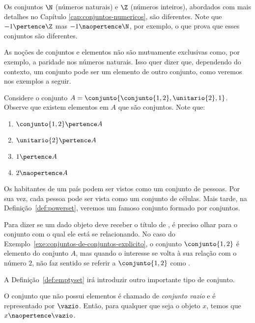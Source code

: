 \begin{example}
    Os conjuntos $\N$ (números naturais) e $\Z$ (números inteiros), abordados com mais detalhes no Capítulo \ref{cap:conjuntos-numericos}, são diferentes. Note que $-1 \pertence \Z$ mas $-1 \naopertence \N$, por exemplo, o que prova que esses conjuntos são diferentes.
\end{example}

As noções de conjuntos e elementos não são mutuamente exclusivas como, por exemplo, a paridade nos números naturais. Isso quer dizer que, dependendo do contexto, um conjunto pode ser um elemento de outro conjunto, como veremos nos exemplos a seguir.

\begin{example}
    \label{exe:conjuntos-de-conjuntos-explicito}
    Considere o conjunto $A = \conjunto{\conjunto{1, 2},\unitario{2}, 1}$. Observe que existem elementos em $A$ que são conjuntos. Note que:
    \begin{enumerate}
        \item $\conjunto{1, 2} \pertence A$
        \item $\unitario{2} \pertence A$
        \item $1 \pertence A$
        \item $2 \naopertence A$
    \end{enumerate}
\end{example}

\begin{example}
    \label{exe:conjuntos-de-conjuntos-implicito}
    Os habitantes de um país podem ser vistos como um conjunto de pessoas. Por sua vez, cada pessoa pode ser vista como um conjunto de células. Mais tarde, na Definição~\ref{def:powerset}, veremos um famoso conjunto formado por conjuntos.
\end{example}

Para dizer se um dado objeto deve receber o título de , é preciso olhar para o conjunto com o qual ele está se relacionando. No caso do Exemplo~\ref{exe:conjuntos-de-conjuntos-explicito}, o conjunto $\conjunto{1, 2}$ é elemento do conjunto $A$, mas quando o interesse se volta à sua relação com o número $2$, não faz sentido se referir a $\conjunto{1, 2}$ como .

A Definição~\ref{def:emptyset} irá introduzir outro importante tipo de conjunto.

\begin{definition}
    \label{def:emptyset} %
    O conjunto que não possui elementos é chamado de \emph{conjunto vazio} e é representado por $\vazio$. Então, para qualquer que seja o objeto $x$, temos que $x \naopertence \vazio$.
\end{definition}

